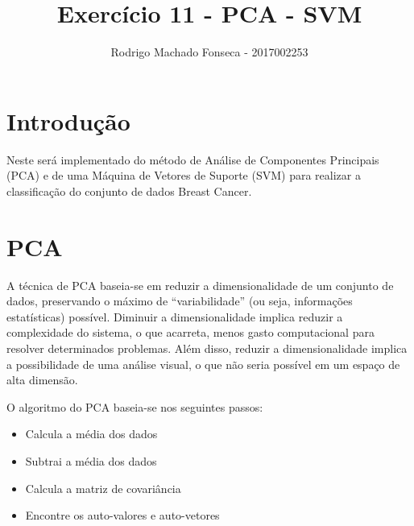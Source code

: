 \documentclass[12pt]{article}
\begin{document}

\pagestyle{fancy}
\fancyhf{}
\renewcommand{\headrulewidth}{0.4pt}
\fancyfoot[C]{\thepage}
\renewcommand{\footrulewidth}{0.4pt}
\fancyfoot[C]{\thepage}
\title{\LARGE \bf
 Exercício  11 - PCA - SVM}
\author{ Rodrigo Machado Fonseca - 2017002253}
\thispagestyle{fancy}
\maketitle
\thispagestyle{fancy}

\section{Introdução}

  \par Neste será implementado do método de Análise de Componentes Principais (PCA) e de uma Máquina de Vetores de Suporte (SVM) para realizar a classificação do conjunto de dados Breast Cancer.
  
\section{PCA}
  
  \par A técnica de PCA baseia-se em  reduzir a dimensionalidade de um conjunto de dados, preservando o máximo de “variabilidade” (ou seja, informações estatísticas) possível. Diminuir a dimensionalidade implica reduzir a complexidade do sistema, o que acarreta, menos gasto computacional para resolver determinados problemas. Além disso, reduzir a dimensionalidade implica a possibilidade de uma análise visual, o que não seria possível em um espaço de alta dimensão. 
  
  \par O algoritmo do PCA baseia-se nos seguintes passos:
  
  \begin{itemize}
    \item Calcula a média dos dados
    \item Subtrai a média dos dados 
    \item Calcula a matriz de covariância
    \item Encontre os auto-valores e auto-vetores
    
  \end{itemize}
  
\end{document}
